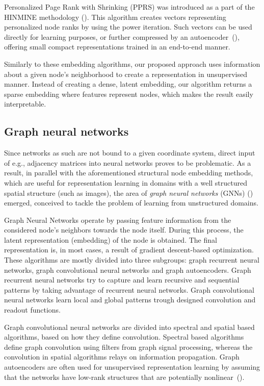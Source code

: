 \documentclass[twoside,11pt]{article}
\begin{document}
Personalized Page Rank with Shrinking (PPRS) was introduced as a part of the HINMINE methodology (\cite{kralj2017hinmine}). This algorithm creates vectors representing personalized node ranks by using the power iteration. Such vectors can be used directly for learning purposes, or further compressed by an autoencoder~(\cite{skrlj2019deep}), offering small compact representations trained in an end-to-end manner.

Similarly to these embedding algorithms, our proposed approach uses information about a given node's neighborhood to create a representation in unsupervised manner. Instead of creating a dense, latent embedding, our algorithm returns a sparse embedding where features represent nodes, which makes the result easily interpretable.

\subsection{Graph neural networks}
\label{sec:gnn}
Since networks as such are not bound to a given coordinate system,  direct input of e.g., adjacency matrices into neural networks proves to be problematic. As a result, in parallel with the aforementioned structural node embedding  methods, which are useful for representation learning in domains with a well structured spatial structure (such as images), the area of \emph{graph neural networks} (GNNs) (\cite{zhang2020deepsurvey,wu2020gnns,xu2018jumping, Bojchevski2019IsPA, klicpera_predict_2019}) emerged, conceived to tackle the problem of learning from unstructured domains.

Graph Neural Networks operate by passing feature information from the considered node's neighbors towards the node itself. During this process, the latent representation (embedding) of the node is obtained. The final representation is, in most cases, a result of gradient descent-based optimization. These algorithms are mostly divided into three subgroups: graph recurrent neural networks, graph convolutional neural networks and graph autoencoders. Graph recurrent neural networks try to capture and learn recursive and sequential patterns by taking advantage of recurrent neural networks. Graph convolutional neural networks learn local and global patterns trough designed convolution and readout functions. 

Graph convolutional neural networks are divided into spectral and spatial based algorithms, based on how they define convolution. Spectral based algorithms define graph convolution using filters from graph signal processing, whereas the convolution in spatial algorithms relays on information propagation. Graph autoencoders are often used for unsupervised representation learning by assuming that the networks have low-rank structures that are potentially nonlinear~(\cite{zhang2020deepsurvey}).
\end{document}

